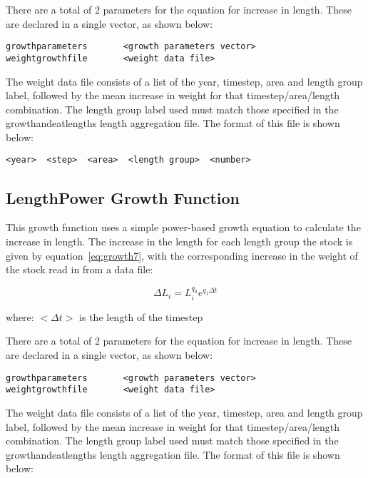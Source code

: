 \documentclass[10pt,twoside]{book}
\begin{document}
\bigskip
There are a total of 2 parameters for the equation for increase in length.  These are declared in a single vector, as shown below:

{\small\begin{verbatim}
growthparameters       <growth parameters vector>
weightgrowthfile       <weight data file>
\end{verbatim}}

The weight data file consists of a list of the year, timestep, area  and length group label, followed by the mean increase in weight for that timestep/area/length combination.  The length group label used must match those specified in the growthandeatlengths length aggregation file.  The format of this file is shown below:

{\small\begin{verbatim}
<year>  <step>  <area>  <length group>  <number>
\end{verbatim}}

\subsection{LengthPower Growth Function}\label{subsec:growth7}
This growth function uses a simple power-based growth equation to calculate the increase in length.  The increase in the length for each length group the stock is given by equation~\ref{eq:growth7}, with the corresponding increase in the weight of the stock read in from a data file:

\begin{equation}\label{eq:growth7}
\Delta L_{i} = L_{i}^{q_{0}} e^{q_{1} \Delta t}
\end{equation}

where:\newline
$<\Delta t>$ is the length of the timestep

\bigskip
There are a total of 2 parameters for the equation for increase in length.  These are declared in a single vector, as shown below:

{\small\begin{verbatim}
growthparameters       <growth parameters vector>
weightgrowthfile       <weight data file>
\end{verbatim}}

The weight data file consists of a list of the year, timestep, area  and length group label, followed by the mean increase in weight for that timestep/area/length combination.  The length group label used must match those specified in the growthandeatlengths length aggregation file.  The format of this file is shown below:
\end{document}
